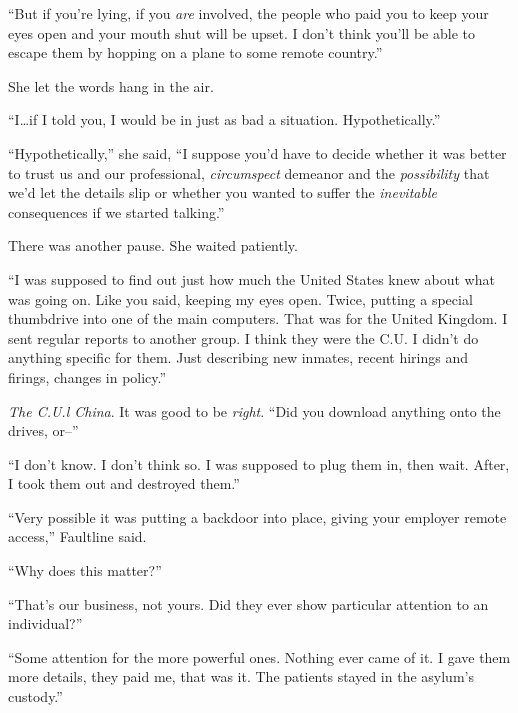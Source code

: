 ``But if you're lying, if you \emph{are} involved, the people who paid you to keep your eyes open and your mouth shut will be upset.  I don't think you'll be able to escape them by hopping on a plane to some remote country.''



She let the words hang in the air.



``I\ldots if I told you, I would be in just as bad a situation.  Hypothetically.''



``Hypothetically,'' she said, ``I suppose you'd have to decide whether it was better to trust us and our professional, \emph{circumspect }demeanor and the \emph{possibility} that we'd let the details slip or whether you wanted to suffer the \emph{inevitable} consequences if we started talking.''



There was another pause.  She waited patiently.



``I was supposed to find out just how much the United States knew about what was going on.  Like you said, keeping my eyes open.  Twice, putting a special thumbdrive into one of the main computers.  That was for the United Kingdom.  I sent regular reports to another group.  I think they were the C.U.  I didn't do anything specific for them.  Just describing new inmates, recent hirings and firings, changes in policy.''



\emph{The C.U.l  China}.  It was good to be \emph{right}.  ``Did you download anything onto the drives, or--''



``I don't know.  I don't think so.  I was supposed to plug them in, then wait.  After, I took them out and destroyed them.''



``Very possible it was putting a backdoor into place, giving your employer remote access,'' Faultline said.



``Why does this matter?''



``That's our business, not yours.  Did they ever show particular attention to an individual?''



``Some attention for the more powerful ones.  Nothing ever came of it.  I gave them more details, they paid me, that was it.  The patients stayed in the asylum's custody.''



